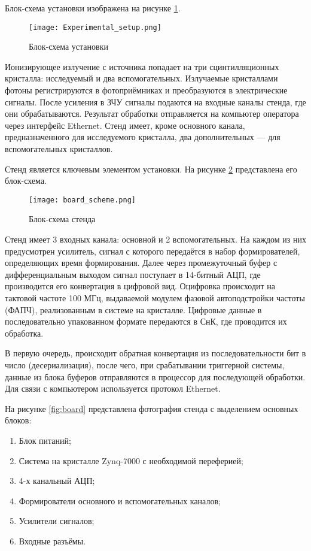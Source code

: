 Блок-схема установки изображена на рисунке \ref{fig:exp_setup}.\par
\begin{figure}[ht]
    \centering
    \texttt{[image: Experimental\_setup.png]}
    \caption{Блок-схема установки}
    \label{fig:exp_setup}
\end{figure}
Ионизирующее излучение с источника попадает на три сцинтилляционных кристалла: исследуемый и два вспомогательных. Излучаемые кристаллами фотоны регистрируются в фотоприёмниках и преобразуются в электрические сигналы. После усиления в ЗЧУ сигналы подаются на входные каналы стенда, где они обрабатываются. Результат обработки отправляется на компьютер оператора через интерфейс Ethernet. Стенд имеет, кроме основного канала, предназначенного для исследуемого кристалла, два дополнительных --- для вспомогательных кристаллов.\par
Стенд является ключевым элементом установки. На рисунке \ref{fig:board_scheme} представлена его блок-схема.\par
\begin{figure}[ht]
    \centering
    \texttt{[image: board\_scheme.png]}
    \caption{Блок-схема стенда}
    \label{fig:board_scheme}
\end{figure}
Стенд имеет 3 входных канала: основной и 2 вспомогательных. На каждом из них предусмотрен усилитель, сигнал с которого передаётся в набор формирователей, определяющих время формирования. Далее через промежуточный буфер с дифференциальным выходом сигнал поступает в 14-битный АЦП, где производится его конвертация в цифровой вид. Оцифровка происходит на тактовой частоте 100 МГц, выдаваемой модулем фазовой автоподстройки частоты (ФАПЧ), реализованным в системе на кристалле. Цифровые данные в последовательно упакованном формате передаются в СнК, где проводится их обработка.\par
В первую очередь, происходит обратная конвертация из последовательности бит в число (десериализация), после чего, при срабатывании триггерной системы, данные из блока буферов отправляются в процессор для последующей обработки. Для связи с компьютером используется протокол Ethernet.\par
На рисунке \ref{fig:board} представлена фотография стенда с выделением основных блоков:\par
\begin{enumerate}
    \item Блок питаний;
    \item Система на кристалле Zynq-7000 с необходимой переферией;
    \item 4-х канальный АЦП;
    \item Формирователи основного и вспомогательных каналов;
    \item Усилители сигналов;
    \item Входные разъёмы. 
\end{enumerate}


